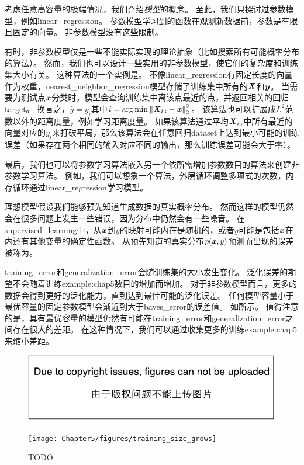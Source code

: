 
考虑任意高容量的极端情况，我们介绍\emph{模型}的概念。
至此，我们只探讨过参数模型，例如\gls{linear_regression}。
参数模型学习到的函数在观测新数据前，参数是有限且固定的向量。
非参数模型没有这些限制。

有时，非参数模型仅是一些不能实际实现的理论抽象（比如搜索所有可能概率分布的算法）。
然而，我们也可以设计一些实用的非参数模型，使它们的复杂度和训练集大小有关。
这种算法的一个实例是。
不像\gls{linear_regression}有固定长度的向量作为权重，\gls{nearest_neighbor_regression}模型存储了训练集中所有的$\boldsymbol{\mathit{X}}$和$\boldsymbol{\mathit{y}}$。
当需要为测试点$\boldsymbol{\mathit{x}}$分类时，模型会查询训练集中离该点最近的点，并返回相关的回归\gls{target}。
换言之，$\hat{y}=y_i$其中$i=\arg\min \left\lVert\boldsymbol{\mathit{X}}_{i,:}-\boldsymbol{\mathit{x}}\right\rVert_2^2$。
该算法也可以扩展成$L^2$范数以外的距离度量，例如学习距离度量\citep{RoweisNCA2005}。
如果该算法通过平均$\boldsymbol{\mathit{X}}_{i,:}$中所有最近的向量对应的$y_i$来打破平局，那么该算法会在任意回归\gls{dataset}上达到最小可能的训练误差（如果存在两个相同的输入对应不同的输出，那么训练误差可能会大于零）。

最后，我们也可以将参数学习算法嵌入另一个依所需增加参数数目的算法来创建非参数学习算法。
例如，我们可以想象一个算法，外层循环调整多项式的次数，内存循环通过\gls{linear_regression}学习模型。


理想模型假设我们能够预先知道生成数据的真实概率分布。
然而这样的模型仍然会在很多问题上发生一些错误，因为分布中仍然会有一些噪音。
在\gls{supervised_learning}中，从$\boldsymbol{\mathit{x}}$到$y$的映射可能内在是随机的，或者$y$可能是包括$\boldsymbol{\mathit{x}}$在内还有其他变量的确定性函数。
从预先知道的真实分布$p(\boldsymbol{\mathit{x}},y)$预测而出现的误差被称为。

\gls{training_error}和\gls{generalization_error}会随训练集的大小发生变化。
泛化误差的期望不会随着训练\gls{example:chap5}数目的增加而增加。
对于非参数模型而言，更多的数据会得到更好的泛化能力，直到达到最佳可能的泛化误差。
任何模型容量小于最优容量的固定参数模型会渐近到大于\gls{bayes_error}的误差值。
如所示。
值得注意的是，具有最优容量的模型仍然有可能在\gls{training_error}和\gls{generalization_error}之间存在很大的差距。
在这种情况下，我们可以通过收集更多的训练\gls{example:chap5}来缩小差距。

\begin{figure}[!htb]
\ifOpenSource
\centerline{\includegraphics{figure.pdf}}
\else
\centerline{\texttt{[image: Chapter5/figures/training\_size\_grows]}}
\fi
\caption{TODO}
\label{fig:chap5_training_size_grows}
\end{figure}

